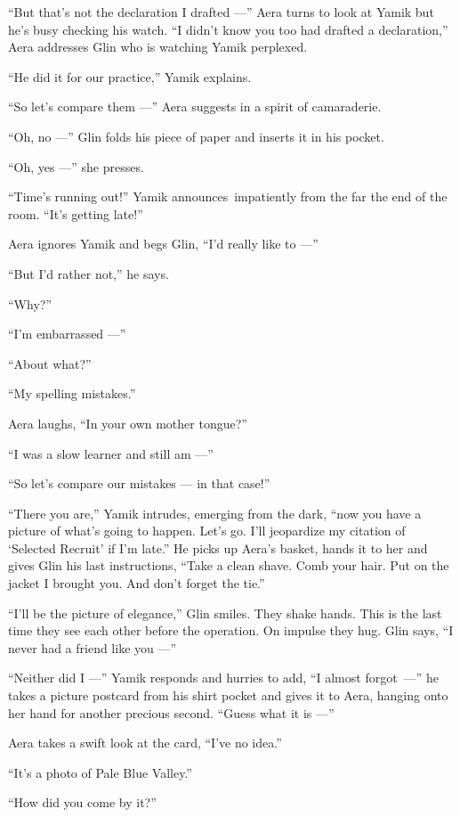 \documentclass[twoside,11pt]{book}
\begin{document}
``But that's not the declaration I drafted ---'' Aera turns to look at Yamik but he's busy
checking his watch. ``I didn't know you too had drafted a declaration,'' Aera addresses Glin
who is watching Yamik perplexed.

``He did it for our practice,'' Yamik explains.

``So let's compare them ---'' Aera suggests in a spirit of camaraderie.

``Oh, no ---'' Glin folds his piece of paper and inserts it in his pocket.

``Oh, yes ---'' she presses.

``Time's running out!'' Yamik announces~impatiently from the far the end of the room.
``It's getting late!''

Aera ignores Yamik and begs Glin, ``I'd really like to ---''

``But I'd rather not,'' he says.

``Why?''

``I'm embarrassed ---''

``About what?''

``My spelling mistakes.''

Aera laughs, ``In your own mother tongue?''

``I was a slow learner and still am ---''

``So let's compare our mistakes --- in that case!''

``There you are,'' Yamik intrudes, emerging from the dark, ``now you have a picture of
what's going to happen. Let's go. I'll jeopardize my citation of `Selected Recruit' if I'm late.''
He picks up Aera's basket, hands it to her and gives Glin his last instructions, ``Take a clean shave.
Comb your hair. Put on the jacket I brought you. And don't forget the tie.''

``I'll be the picture of elegance,'' Glin smiles. They shake hands. This is the last time they
see each other before the operation. On impulse they hug. Glin says, ``I never had a friend like you ---''

``Neither did I ---'' Yamik responds and hurries to add,
``I almost forgot~---'' he takes a picture postcard from his shirt pocket and
gives it to Aera, hanging onto her hand for another
precious second. ``Guess what it is ---''

Aera takes a swift look at{ }the card, ``I've no idea.''

``It's a photo of Pale Blue Valley.''

``How did you come by it?''
\end{document}
